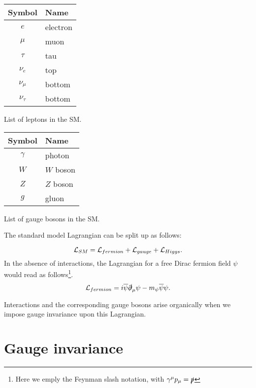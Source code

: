 \begin{margintable}[-3cm]
  \centering
\begin{tabular}{c|l}
    Symbol & Name \\
  \hline
    $e$ & electron\\
    $\mu$ & muon \\
    $\tau$ & tau \\
    $\nu_e$ & top \\
    $\nu_\mu$ & bottom \\
    $\nu_\tau$ & bottom \\
  \end{tabular}
  \caption{List of leptons in the SM.}
  \label{tab:leptons}
\end{margintable}

\begin{margintable}
  \centering
\begin{tabular}{c|l}
    Symbol & Name \\
  \hline
    $\gamma$ & photon\\
    $W$ & $W$ boson \\
    $Z$ & $Z$ boson \\
    $g$ & gluon \\
  \end{tabular}
  \caption{List of gauge bosons in the SM.}
  \label{tab:gaugebosons}
\end{margintable}

The standard model Lagrangian can be split up as follows:

$$\mathcal{L}_{SM} = \mathcal{L}_{fermion}+\mathcal{L}_{gauge}+\mathcal{L}_{Higgs}.$$
In the absence of interactions, the Lagrangian for a free Dirac fermion field $\psi$ would read as follows\footnote{Here we emply the Feynman slash notation, with $\gamma^\mu p_\mu = \slashed{p}$}.
\begin{align}
\mathcal{L}_{fermion} = i\overline{\psi}\slashed{\partial}_\mu\psi-m_{\psi}\overline{\psi}\psi.
\label{eq:fermion_lagrangian}
\end{align}

Interactions and the corresponding gauge bosons arise organically when we impose gauge invariance upon this Lagrangian.

\section{Gauge invariance}\label{sec:gauge_invariance}

